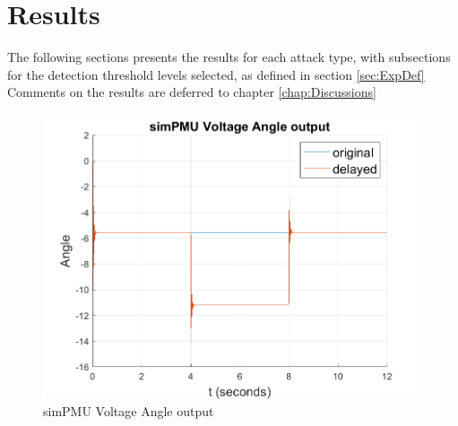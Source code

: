 \chapter{Results} \label{chap:Results}


The following sections presents the results for each attack type, with subsections for the detection threshold levels selected, as defined in section \ref{sec:ExpDef} \\ 

Comments on the results are deferred to chapter \ref{chap:Discussions}


\begin{figure}[ht]
    \includegraphics[width=\textwidth]{figures/v_Angfig.png}    
    \caption{simPMU Voltage Angle output}
    \label{fig:simPMU-angfig}
\end{figure}

